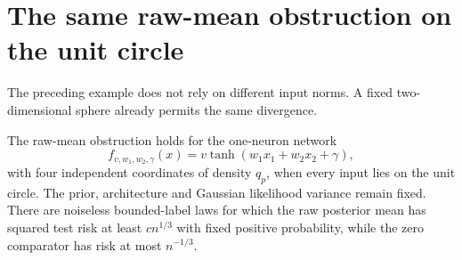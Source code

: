 \section{The same raw-mean obstruction on the unit circle}
\label{sec:raw-student-circle}
The preceding example does not rely on different input norms. A fixed two-dimensional sphere already permits the same divergence.

\begin{corollary}
\label{cor:raw-student-circle}
The raw-mean obstruction holds for the one-neuron network
\[
 f_{v,w_1,w_2,\gamma}(x)=v\tanh(w_1x_1+w_2x_2+\gamma),
\]
with four independent coordinates of density $q_p$, when every input lies on the unit circle. The prior, architecture and Gaussian likelihood variance remain fixed. There are noiseless bounded-label laws for which the raw posterior mean has squared test risk at least $c n^{1/3}$ with fixed positive probability, while the zero comparator has risk at most $n^{-1/3}$.
\end{corollary}
